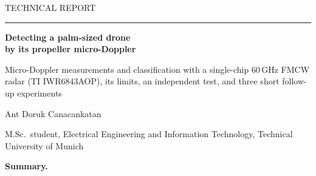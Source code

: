 \documentclass[11pt,a4paper]{article}
\begin{document}
\begin{titlepage}
\setlength{\parindent}{0pt}
\vspace*{1.5cm}
{\sffamily\small TECHNICAL REPORT}\par
\vspace{0.4cm}\hrule\vspace{1.2cm}
{\sffamily\bfseries\huge Detecting a palm-sized drone\\[4pt] by its propeller micro-Doppler\par}
\vspace{0.6cm}
{\sffamily\Large Micro-Doppler measurements and classification with a single-chip 60\,GHz FMCW radar (TI IWR6843AOP), its limits, an independent test, and three short follow-up experiments\par}
\vspace{1.0cm}
{\large Ant Doruk Canacankatan\par}
{\small M.Sc.\ student, Electrical Engineering and Information Technology, Technical University of Munich\par}
\vspace{1.0cm}
\begin{minipage}{0.92\linewidth}
\small\textbf{Summary.}

\end{minipage}
\end{titlepage}
\end{document}
